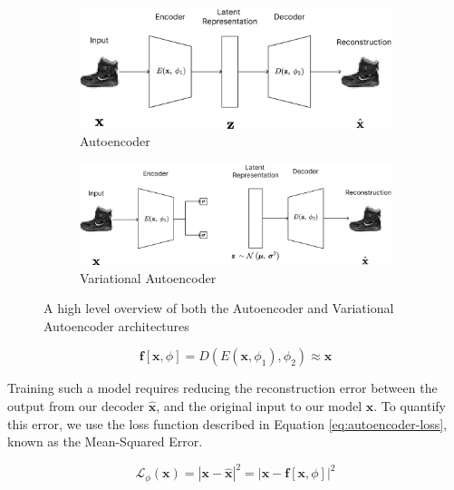 \documentclass[twocolumn]{article}
\begin{document}
\begin{figure}
    \centering
    \begin{subfigure}[t]{\columnwidth}
        \centering
        \includegraphics[scale=0.06]{../images/autoencoder.png}
        \caption{Autoencoder}
        \label{fig:autoencoder}
    \end{subfigure}

    \begin{subfigure}[t]{\columnwidth}
        \centering
        \includegraphics[scale=0.06]{../images/vae.png}
        \caption{Variational Autoencoder}
        \label{fig:vae}
    \end{subfigure}

    \caption{A high level overview of both the Autoencoder and Variational Autoencoder architectures}
\end{figure}

\begin{equation}\label{eq:autoencoder}
\mathbf{f}\left[\mathbf{x}, \phi\right] = D\left(E\left(\mathbf{x}, \phi_1\right), \phi_2\right) \approx \textbf{x}
\end{equation}

Training such a model requires reducing the reconstruction error between the output from our decoder \(\hat{\textbf{x}}\), and the original input to our model \(\mathbf{x}\). To quantify this error, we use the loss function described in Equation \ref{eq:autoencoder-loss}, known as the Mean-Squared Error. 

\begin{equation}\label{eq:autoencoder-loss}
    \mathcal{L}_\phi\left(\mathbf{x}\right) = |\mathbf{x} - \hat{\mathbf{x}}|^2 = |\mathbf{x} - \mathbf{f}\left[\mathbf{x}, \phi\right]|^2
\end{equation}
\end{document}
